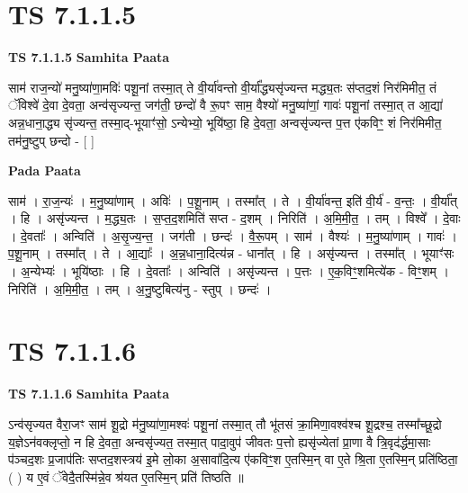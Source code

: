 \documentclass[17pt]{extarticle}
\begin{document}

\section{ TS 7.1.1.5 }

\textbf{TS 7.1.1.5 } \newline
\textbf{Samhita Paata} \newline

साम॑ राज॒न्यो॑ मनु॒ष्या॑णा॒मविः॑ पशू॒नां तस्मा॒त् ते वी॒र्या॑वन्तो वी॒र्या᳚द्ध्यसृ॑ज्यन्त मद्ध्य॒तः स॑प्तद॒शं निर॑मिमीत॒ तं ॅविश्वे॑ दे॒वा दे॒वता॒ अन्व॑सृज्यन्त॒ जग॑ती॒ छन्दो॑ वै रू॒पꣳ साम॒ वैश्यो॑ मनु॒ष्या॑णां॒ गावः॑ पशू॒नां तस्मा॒त् त आ॒द्या॑ अन्न॒धाना॒द्ध्य सृ॑ज्यन्त॒ तस्मा॒द्-भूयाꣳ॑सो॒ ऽन्येभ्यो॒ भूयि॑ष्ठा॒ हि दे॒वता॒ अन्वसृ॑ज्यन्त प॒त्त ए॑कविꣳ॒॒ शं निर॑मिमीत॒ तम॑नु॒ष्टुप् छन्दो - [  ] \newline

\textbf{Pada Paata} \newline

साम॑ । रा॒ज॒न्यः॑ । म॒नु॒ष्या॑णाम् । अविः॑ । प॒शू॒नाम् । तस्मा᳚त् । ते । वी॒र्या॑वन्त॒ इति॑ वी॒र्य॑ - व॒न्तः॒ । वी॒र्या᳚त् । हि । असृ॑ज्यन्त । म॒द्ध्य॒तः । स॒प्त॒द॒शमिति॑ सप्त - द॒शम् । निरिति॑ । अ॒मि॒मी॒त॒ । तम् । विश्वे᳚ । दे॒वाः । दे॒वताः᳚ । अन्विति॑ । अ॒सृ॒ज्य॒न्त॒ । जग॑ती । छन्दः॑ । वै॒रू॒पम् । साम॑ । वैश्यः॑ । म॒नु॒ष्या॑णाम् । गावः॑ । प॒शू॒नाम् । तस्मा᳚त् । ते । आ॒द्याः᳚ । अ॒न्न॒धाना॒दित्य॑न्न - धाना᳚त् । हि । असृ॑ज्यन्त । तस्मा᳚त् । भूयाꣳ॑सः । अ॒न्येभ्यः॑ । भूयि॑ष्ठाः । हि । दे॒वताः᳚ । अन्विति॑ । असृ॑ज्यन्त । प॒त्तः । ए॒क॒विꣳ॒॒शमित्ये॑क - विꣳ॒॒शम् । निरिति॑ । अ॒मि॒मी॒त॒ । तम् । अ॒नु॒ष्टुबित्य॑नु - स्तुप् । छन्दः॑ ।  \newline





\section{ TS 7.1.1.6 }

\textbf{TS 7.1.1.6 } \newline
\textbf{Samhita Paata} \newline

ऽन्व॑सृज्यत वैरा॒जꣳ साम॑ शू॒द्रो म॑नु॒ष्या॑णा॒मश्वः॑ पशू॒नां तस्मा॒त् तौ भू॑तसं क्रा॒मिणा॒वश्व॑श्च शू॒द्रश्च॒ तस्मा᳚च्छू॒द्रो य॒ज्ञेऽन॑वक्लृप्तो॒ न हि दे॒वता॒ अन्वसृ॑ज्यत॒ तस्मा॒त् पादा॒वुप॑ जीवतः प॒त्तो ह्यसृ॑ज्येतां प्रा॒णा वै त्रि॒वृद॑र्द्धमा॒साः प॑ञ्चद॒शः प्र॒जाप॑तिः सप्तद॒शस्त्रय॑ इ॒मे लो॒का अ॒सावा॑दि॒त्य ए॑कविꣳ॒॒श ए॒तस्मि॒न् वा ए॒ते श्रि॒ता ए॒तस्मि॒न् प्रति॑ष्ठिता॒ ( ) य ए॒वं ॅवेदै॒तस्मि॑न्ने॒व श्र॑यत ए॒तस्मि॒न् प्रति॑ तिष्ठति ॥ \newline
\end{document}

